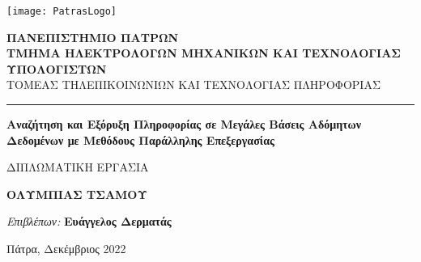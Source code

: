 \begin{titlepage}
    \begin{minipage}{4cm}
    \centering
        \texttt{[image: PatrasLogo]}
    \end{minipage}
    \hspace{0.25cm}
    \begin{minipage}{0.6\textwidth}
        \large
        \textbf{ΠΑΝΕΠΙΣΤΗΜΙΟ ΠΑΤΡΩΝ}\\%
        \normalsize
        \textbf{ΤΜΗΜΑ ΗΛΕΚΤΡΟΛΟΓΩΝ ΜΗΧΑΝΙΚΩΝ ΚΑΙ ΤΕΧΝΟΛΟΓΙΑΣ ΥΠΟΛΟΓΙΣΤΩΝ}\\%
     ΤΟΜΕΑΣ ΤΗΛΕΠΙΚΟΙΝΩΝΙΩΝ ΚΑΙ ΤΕΧΝΟΛΟΓΙΑΣ ΠΛΗΡΟΦΟΡΙΑΣ\\    
    \end{minipage}
    \vspace{0.5cm}
    \hrule
    \hfill
    
    \begin{center}
        \vspace*{2cm}

        \LARGE
        \textbf{Αναζήτηση και Εξόρυξη Πληροφορίας σε Μεγάλες Βάσεις Αδόμητων Δεδομένων με Μεθόδους Παράλληλης Επεξεργασίας}
        
        \vspace{2cm}
        \Large
        ΔΙΠΛΩΜΑΤΙΚΗ ΕΡΓΑΣΙΑ
        
        \vspace{0.5cm}
        \LARGE
        \textbf{ΟΛΥΜΠΙΑΣ ΤΣΑΜΟΥ}
        
        \vspace{3.5cm}
        \vfill
        
        \flushleft

       \large \hspace{0.8cm} \textit{Επιβλέπων:} \textbf{Ευάγγελος Δερματάς}\\
     \centering
    \vspace{1cm}
    \vfill

       Πάτρα, Δεκέμβριος 2022
        
    \end{center}
    \restoregeometry

\cleardoublepage
    \thispagestyle{empty}
    \vspace*{\fill}
    \begin{minipage}{\textwidth}
        

\end{minipage}
\end{titlepage}
